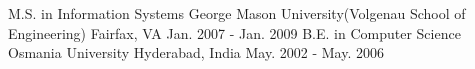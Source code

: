 

\begin{cventries}

  \cventry
    {M.S. in Information Systems} %
    {George Mason University(Volgenau School of Engineering)} %
    {Fairfax, VA} %
    {Jan. 2007 - Jan. 2009} %
    {}
\cventry
    {B.E. in Computer Science} %
    {Osmania University} %
    {Hyderabad, India} %
    {May. 2002 - May. 2006} %
    {}
\end{cventries}
